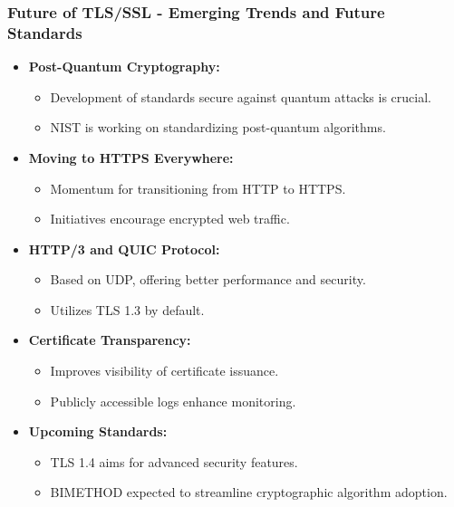 \documentclass{beamer}
\begin{document}
\begin{frame}[fragile]
    \frametitle{Future of TLS/SSL - Emerging Trends and Future Standards}
    \begin{itemize}
        \item \textbf{Post-Quantum Cryptography:} 
            \begin{itemize}
                \item Development of standards secure against quantum attacks is crucial.
                \item NIST is working on standardizing post-quantum algorithms.
            \end{itemize}
        \item \textbf{Moving to HTTPS Everywhere:} 
            \begin{itemize}
                \item Momentum for transitioning from HTTP to HTTPS.
                \item Initiatives encourage encrypted web traffic.
            \end{itemize}
        \item \textbf{HTTP/3 and QUIC Protocol:} 
            \begin{itemize}
                \item Based on UDP, offering better performance and security.
                \item Utilizes TLS 1.3 by default.
            \end{itemize}
        \item \textbf{Certificate Transparency:} 
            \begin{itemize}
                \item Improves visibility of certificate issuance.
                \item Publicly accessible logs enhance monitoring.
            \end{itemize}
        \item \textbf{Upcoming Standards:}
            \begin{itemize}
                \item TLS 1.4 aims for advanced security features.
                \item BIMETHOD expected to streamline cryptographic algorithm adoption.
            \end{itemize}
    \end{itemize}
\end{frame}
\end{document}
